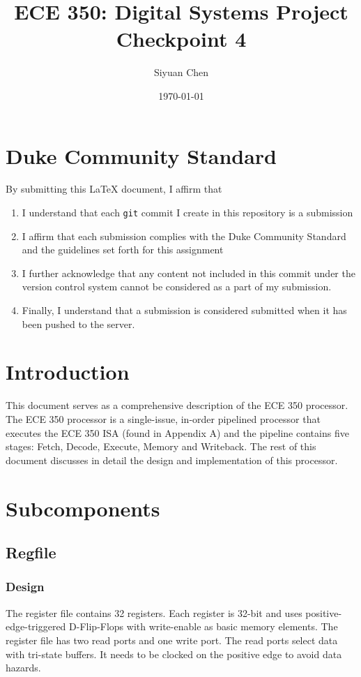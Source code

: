 \documentclass{article}
\begin{document}
\title{ECE 350: Digital Systems Project Checkpoint 4}
\author{Siyuan Chen} %
\date{\today} %
\maketitle

\section*{Duke Community Standard}

By submitting this \LaTeX{} document, I affirm that
\begin{enumerate}
    \item I understand that each \texttt{git} commit I create in this repository is a submission
    \item I affirm that each submission complies with the Duke Community Standard and the guidelines set forth for this assignment
    \item I further acknowledge that any content not included in this commit under the version control system cannot be considered as a part of my submission.
    \item Finally, I understand that a submission is considered submitted when it has been pushed to the server.
\end{enumerate}

\section{Introduction}
This document serves as a comprehensive description of the ECE 350 processor. The ECE 350 processor is a single-issue, in-order pipelined processor that executes the ECE 350 ISA (found in Appendix A) and the pipeline contains five stages: Fetch, Decode, Execute, Memory and Writeback. The rest of this document discusses in detail the design and implementation of this processor.

\section{Subcomponents}
\subsection{Regfile}
\subsubsection{Design}
The register file contains 32 registers. Each register is 32-bit and uses positive-edge-triggered D-Flip-Flops with write-enable as basic memory elements. The register file has two read ports and one write port. The read ports select data with tri-state buffers. It needs to be clocked on the positive edge to avoid data hazards. 
\end{document}
